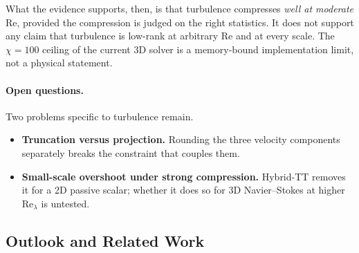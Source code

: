 What the evidence supports, then, is that turbulence compresses \emph{well at
moderate} $\mathrm{Re}$, provided the compression is judged on the right
statistics. It does not support any claim that turbulence is low-rank at
arbitrary $\mathrm{Re}$ and at every scale. The $\chi = 100$ ceiling of the
current 3D solver is a memory-bound implementation limit, not a physical
statement.

\paragraph{Open questions.}
Two problems specific to turbulence remain.
\begin{itemize}
  \item \textbf{Truncation versus projection.} Rounding the three velocity
    components separately breaks the constraint that couples them.
  \item \textbf{Small-scale overshoot under strong compression.} Hybrid-TT
    removes it for a 2D passive scalar; whether it does so for 3D
    Navier--Stokes at higher $\mathrm{Re}_\lambda$ is untested.
\end{itemize}

\subsection{Outlook and Related Work}
\label{subsec:part3-outlook}

